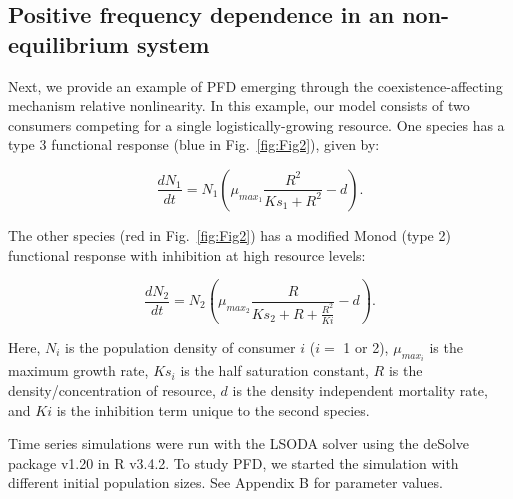 				
				
\subsection{Positive frequency dependence in an non-equilibrium system}
Next, we provide an example of PFD emerging through the coexistence-affecting mechanism relative nonlinearity. In this example, our model consists of two consumers competing for a single logistically-growing resource. One species has a type 3 functional response (blue in Fig.~\ref{fig:Fig2}), given by: 
				
\begin{equation}
\frac{dN_{1}}{dt} = N_{1}(\mu _{max_{1}}\frac{R^2}{Ks_{1} + R^2}-d).\tag{3.15}\label{eq:3.15}
\end{equation}
				
The other species (red in Fig.~\ref{fig:Fig2}) has a modified Monod (type 2) functional response with inhibition at high resource levels: 
				
\begin{equation}
\frac{dN_{2}}{dt} = N_{2}(\mu _{max_{2}}\frac{R}{Ks_{2} + R + \frac{R^2}{Ki}}-d).\tag{3.16}\label{eq:3.16}
\end{equation}
				
Here, $N_{i}$ is the population density of consumer $i$ ($i = $ 1 or 2), $\mu_{max_{i}}$ is the maximum growth rate, $Ks_{i}$ is the half saturation constant, $R$ is the density/concentration of resource, $d$ is the density independent mortality rate, and $Ki$ is the inhibition term unique to the second species. 
\par


Time series simulations were run with the LSODA solver using the deSolve package v1.20 \citep{soetaert2016package} in R v3.4.2. To study PFD, we started the simulation with different initial population sizes. See Appendix B for parameter values. 
\par

				



